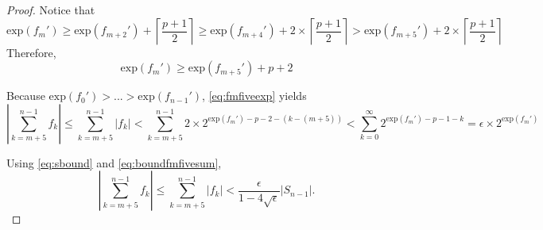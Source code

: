 \documentclass[12pt]{article}
\providecommand{\ceil}[1]{\left \lceil #1 \right \rceil }
\providecommand{\exp}{\ensuremath{\text{exp}}}
\theoremstyle{definition}
\numberwithin{equation}{section}
\numberwithin{figure}{section}
\begin{document}
\begin{proof}

      Notice that
        \begin{equation*}
          \exp(f_m') \geq \exp(f_{m + 2}') + \ceil{\frac{p+ 1}{2}} \geq \exp(f_{m + 4}') + 2 \times \ceil{\frac{p + 1}{2}} > \exp(f_{m + 5}')+ 2 \times \ceil{\frac{p+ 1}{2}}
        \end{equation*}
      Therefore,
        \begin{equation}
          \exp(f_m') \geq \exp(f_{m + 5}') + p + 2
          \label{eq:fmfiveexp}
        \end{equation}

      Because $\exp(f_0') > ... > \exp(f_{n - 1}')$, \eqref{eq:fmfiveexp} yields
        \begin{equation}
          |\sum\limits_{k = m + 5}^{n - 1} f_k| \leq \sum\limits_{k = m + 5}^{n - 1} |f_k| < \sum\limits_{k = m + 5}^{n - 1} 2 \times 2^{\exp(f_m') - p - 2 - (k - (m + 5))} < \sum\limits_{k = 0}^{\infty} 2^{\exp(f_m') - p - 1 - k} = \epsilon \times 2^{\exp(f_m')}
          \label{eq:boundfmfivesum}
        \end{equation}

      Using \eqref{eq:sbound} and \eqref{eq:boundfmfivesum},
        \begin{equation}
          |\sum\limits_{k = m + 5}^{n - 1} f_k| \leq \sum\limits_{k = m + 5}^{n - 1} |f_k| < \frac{\epsilon}{1 - 4 \sqrt\epsilon}|S_{n-1}|.
          \label{eq:relsboundfmfivesum}
        \end{equation}


\end{proof}
\end{document}

